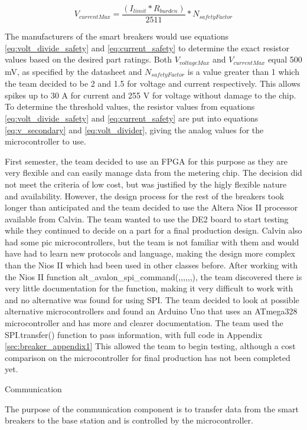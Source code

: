 \begin{equation} %
V_{currentMax}=\frac{(I_{limit}*R_{burden})}{2511}*N_{safetyFactor}
\label{eq:current_safety}
\end{equation}

The manufacturers of the smart breakers would use equations \ref{eq:volt_divide_safety} and \ref{eq:current_safety} to determine the exact resistor values based on the desired part ratings. Both $V_{voltageMax}$ and $V_{currentMax}$ equal 500 mV, as specified by the datasheet \cite{ADE7763} and $N_{safetyFactor}$ is a value greater than 1 which the team decided to be 2 and 1.5 for voltage and current respectively. This allows spikes up to 30 A for current and 255 V for voltage without damage to the chip. To determine the threshold values, the resistor values from equations \ref{eq:volt_divide_safety} and \ref{eq:current_safety} are put into equations \ref{eq:v_secondary} and \ref{eq:volt_divider}, giving the analog values for the microcontroller to use.

First semester, the team decided to use an FPGA for this purpose as they are very flexible and can easily manage data from the metering chip. The decision did not meet the criteria of low cost, but was justified by the higly flexible nature and availability. However, the design process for the rest of the breakers took longer than anticipated and the team decided to use the Altera Nios II processor available from Calvin. The team wanted to use the DE2 board to start testing while they continued to decide on a part for a final production design. Calvin also had some pic microcontrollers, but the team is not familiar with them and would have had to learn new protocols and language, making the design more complex than the Nios II which had been used in other classes before. After working with the Nios II function alt\_avalon\_spi\_command(,,,,,,), the team discovered there is very little documentation for the function, making it very difficult to work with and no alternative was found for using SPI. The team decided to look at possible alternative microcontrollers and found an Arduino Uno that uses an ATmega328 microcontroller and has more and clearer documentation. The team used the SPI.transfer() function to pass information, with full code in Appendix \ref{sec:breaker_appendix1} This allowed the team to begin testing, although a cost comparison on the microcontroller for final production has not been completed yet.

Communication

The purpose of the communication component is to transfer data from the smart breakers to the base station and is controlled by the microcontroller. 

